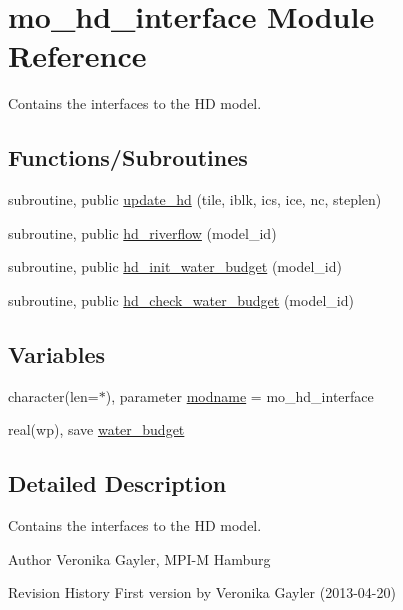 \hypertarget{namespacemo__hd__interface}{}\section{mo\+\_\+hd\+\_\+interface Module Reference}
\label{namespacemo__hd__interface}


Contains the interfaces to the H\+D model.  


\subsection*{Functions/\+Subroutines}
\begin{DoxyCompactItemize}
\item 
subroutine, public \hyperlink{namespacemo__hd__interface_a9c78647e6d4247940081f0f4cb58732c}{update\+\_\+hd} (tile, iblk, ics, ice, nc, steplen)
\item 
subroutine, public \hyperlink{namespacemo__hd__interface_a442c9e62dd9269647a8155a450cedca4}{hd\+\_\+riverflow} (model\+\_\+id)
\item 
subroutine, public \hyperlink{namespacemo__hd__interface_a2ed0f02d21d19a090c35f013754a4a6c}{hd\+\_\+init\+\_\+water\+\_\+budget} (model\+\_\+id)
\item 
subroutine, public \hyperlink{namespacemo__hd__interface_a87e2bf2b3a7f9c37b5a8e75a6e6e1525}{hd\+\_\+check\+\_\+water\+\_\+budget} (model\+\_\+id)
\end{DoxyCompactItemize}
\subsection*{Variables}
\begin{DoxyCompactItemize}
\item 
character(len=$\ast$), parameter \hyperlink{namespacemo__hd__interface_a946d721348db93e22eccc082dff915ce}{modname} = \textquotesingle{}mo\+\_\+hd\+\_\+interface\textquotesingle{}
\item 
real(wp), save \hyperlink{namespacemo__hd__interface_af6eeeb10243506ceeced69bf2bf7835f}{water\+\_\+budget}
\end{DoxyCompactItemize}


\subsection{Detailed Description}
Contains the interfaces to the H\+D model. 

\begin{DoxyAuthor}{Author}
Veronika Gayler, M\+P\+I-\/\+M Hamburg
\end{DoxyAuthor}
\begin{DoxyParagraph}{Revision History}
First version by Veronika Gayler (2013-\/04-\/20) 
\end{DoxyParagraph}


